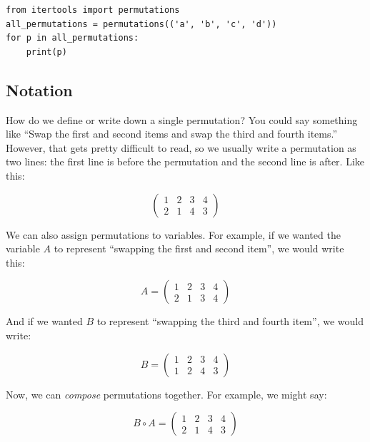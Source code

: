 \begin{verbatim}
from itertools import permutations
all_permutations = permutations(('a', 'b', 'c', 'd'))
for p in all_permutations:
    print(p)
\end{verbatim}

\subsection{Notation}

How do we define or write down a single permutation? You could say
something like ``Swap the first and second items and swap the third
and fourth items.'' However, that gets pretty difficult to read, so we
usually write a permutation as two lines: the first line is before
the permutation and the second line is after.  Like this:

$$\begin{pmatrix}
  1 & 2 & 3 & 4 \\
  2 & 1 & 4 & 3
\end{pmatrix}$$

We can also assign permutations to variables. For example, if we wanted the
variable $A$ to represent ``swapping the first and second item'', we
would write this:

$$A = \begin{pmatrix}
  1 & 2 & 3 & 4 \\
  2 & 1 & 3 & 4
\end{pmatrix}$$

And if we wanted $B$ to represent ``swapping the third and fourth item'', we would write:

$$B = \begin{pmatrix}                                                                                                                             
  1 & 2 & 3 & 4 \\                                                                                                                                
  1 & 2 & 4 & 3
\end{pmatrix}$$

Now, we can \textit{compose} permutations together. For example, we might say:

$$B \circ A = \begin{pmatrix}
  1 & 2 & 3 & 4 \\
  2 & 1 & 4 & 3
\end{pmatrix}$$

